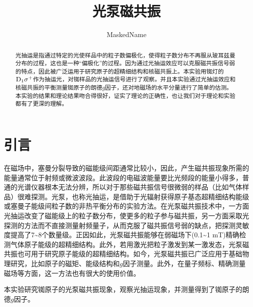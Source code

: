 \documentclass[font=default]{mpltx}
\begin{document}
\title{光泵磁共振} %
\author{MaskedName} %
\date{}
\begin{abstract}
  光抽运是指通过特定的光使样品中的粒子数偏极化，使得粒子数分布不再服从玻耳兹曼分布的过程，这也是一种“偏极化”的过程。因为通过光抽运效应可以克服磁共振信号弱的特点，因此被广泛运用于研究原子的超精细结构和核磁共振上。本实验用铷灯的${\rm D_1\sigma^+}$作为抽运光，对铷样品的光抽运信号进行了观察。并且本实验通过光抽运效应和核磁共振的平衡测量铷原子的朗德$g$因子，还对地磁场的水平分量进行了简单的估测。本实验的结果和理论结果吻合得很好，证实了理论的正确性，也让我们对于理论和实验都有了更深的理解。
\end{abstract}

\maketitle

\section{引言}
在磁场中，塞曼分裂导致的磁能级间距通常比较小，因此，产生磁共振现象所需的
能量通常位于射频或微波波段。此波段的电磁波能量要比光频段的能量小得多，普通的光谱仪器根本无法分辨，所以对于那些磁共振信号很微弱的样品（比如气体样品）很难探测。光泵，也称光抽运，是借助于光辐射获得原子基态超精细结构能级或塞曼子能级间粒子数的非热平衡分布的实验方法。在光泵磁共振技术中，一方面光抽运改变了磁能级上的粒子数分布，使更多的粒子参与磁共振，另一方面采取光探测的方法而不直接测量射频量子，从而克服了磁共振信号弱的缺点，把探测灵敏度提高了7\textasciitilde8个数量级。正因如此，光泵磁共振能够在弱磁场下(0.1\textasciitilde1 mT)精确检测气体原子能级的超精细结构。此外，若用激光把粒子激发到某一激发态，光泵磁共振也可用于研究原子能级的超精细结构。如今，光泵磁共振已广泛应用于基础物理研究，比如原子的磁矩、能级结构和$g$因子测量。此外，在量子频标、精确测量磁场等方面，这一方法也有很大的使用价值。

本实验研究铷原子的光泵磁共振现象，观察光抽运现象，并测量得到了铷原子的朗德$g$因子。
\end{document}
